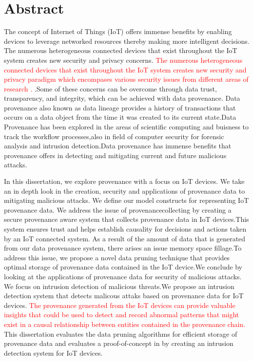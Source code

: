 

\chapter*{Abstract}
The concept of Internet of Things (IoT) offers immense benefits by
enabling devices to leverage networked resources thereby making more intelligent
decisions. The numerous heterogeneous connected devices that exist throughout
the IoT system creates new security and privacy concerns. \textcolor{red}{The numerous heterogeneous connected devices that exist throughout
the IoT system creates new security and privacy paradigm which encompases various security issues from different areas of research .} .Some of these concerns can
be overcome through data trust, transparency, and integrity, which can be
achieved with data provenance. Data provenance also known as data lineage provides a history of transactions that occurs on a data object from the time it was created to its current state.Data Provenance has been explored in the areas of scientific computing and buisness to track the workflow processes,also in field of computer security for forensic analysis and intrusion detection.Data provenance has immense benefits that provenance offers in detecting and mitigating current and future malicious attacks.  \par In this dissertation, we explore provenance with a focus on IoT devices. We take an in depth look  in the creation, security and applications of provenance data to mitigating malicious attacks. We define our model constructs for representing IoT provenance data. We address the issue of provenancecollecting by creating a secure provenance aware system that collects provenance data in IoT devices.This system ensures trust and helps establish causality for decisions and actions taken by an IoT connected system. As a result of the amount of data that is generated from our data provenance system, there arises an issue memory space fillage.To address this issue, we propose a novel data pruning technique that provides optimal storage of provenance data contained in the IoT device.We conclude by looking at the applications of provenance data for security of malicious attacks. We focus on intrusion detection of malicious threats.We propose an intrusion detection system that detects malicous attaks based on provenance data for IoT devices. \textcolor{red}{The provenance generated from the IoT devices can provide valuable insights that could be used to detect and record abnormal patterns that might exist in a causal relationship between entities contained in the provenance chain.} This dissertation evaluates the data pruning algorithms for efficient storage of provenance data and evaluates a proof-of-concept in by creating an intrusion detection system for IoT devices.

